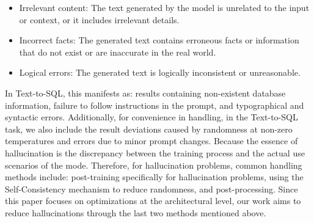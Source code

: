 
\begin{itemize}
    \item Irrelevant content: The text generated by the model is unrelated to the input or context, or it includes irrelevant details.
    \item Incorrect facts: The generated text contains erroneous facts or information that do not exist or are inaccurate in the real world.
    \item Logical errors: The generated text is logically inconsistent or unreasonable.
\end{itemize}

In Text-to-SQL, this manifests as: results containing non-existent database information, failure to follow instructions in the prompt, and typographical and syntactic errors. Additionally, for convenience in handling, in the Text-to-SQL task, we also include the result deviations caused by randomness at non-zero temperatures and errors due to minor prompt changes.
Because the essence of hallucination is the discrepancy between the training process and the actual use scenarios of the mode. Therefore, for hallucination problems, common handling methods include: post-training specifically for hallucination problems, using the Self-Consistency mechanism to reduce randomness, and post-processing. Since this paper focuses on optimizations at the architectural level, our work aims to reduce hallucinations through the last two methods mentioned above.

